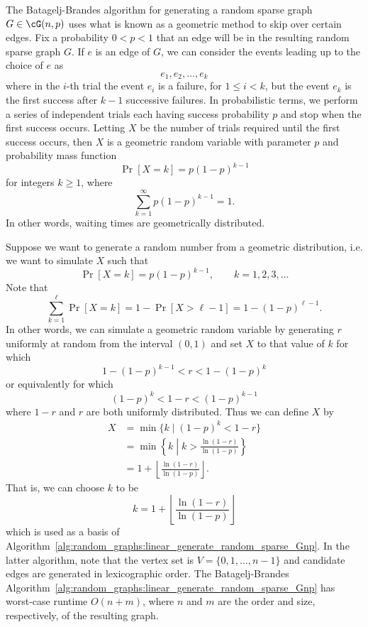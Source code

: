 The Batagelj-Brandes algorithm for
generating a random sparse graph $G \in \cG(n,p)$ uses what is known as
a geometric method to skip over certain edges. Fix a probability
$0 < p < 1$ that an edge will be in the resulting random sparse graph
$G$. If $e$ is an edge of $G$, we can consider the events leading up
to the choice of $e$ as
\[
e_1, e_2, \dots, e_k
\]
where in the $i$-th trial the event $e_i$ is a failure, for
$1 \leq i < k$, but the event $e_k$ is the first success after
$k - 1$ successive failures. In probabilistic terms, we perform a
series of independent trials each having success probability $p$ and
stop when the first success occurs. Letting $X$ be the number of
trials required until the first success occurs, then $X$ is a
geometric random variable with parameter $p$ and probability mass
function
\begin{equation}
\label{eqn:random_graphs:probability_mass_function_geometric_distribution}
\Pr[X = k]
=
p (1 - p)^{k - 1}
\end{equation}
for integers $k \geq 1$, where
\[
\sum_{k=1}^\infty p (1 - p)^{k - 1}
=
1.
\]
In other words, waiting times are
geometrically distributed.

Suppose we want to generate a random
number from a
geometric distribution, i.e. we want to
simulate $X$ such that
\[
\Pr[X = k]
=
p (1 - p)^{k-1},
\qquad
k = 1, 2, 3, \dots
\]
Note that
\[
\sum_{k=1}^{\ell} \Pr[X=k]
=
1 - \Pr[X > \ell - 1]
=
1 - (1 - p)^{\ell - 1}.
\]
In other words, we can simulate a
geometric random variable by
generating $r$ uniformly at random from the interval $(0,1)$ and set
$X$ to that value of $k$ for which
\[
1 - (1 - p)^{k-1} < r < 1 - (1 - p)^k
\]
or equivalently for which
\[
(1 - p)^k < 1 - r < (1 - p)^{k-1}
\]
where $1 - r$ and $r$ are both uniformly
distributed. Thus we can define $X$ by
\begin{align*}
X
&=
\min\{k \mid (1 - p)^k < 1 - r\} \\[4pt]
&=
\min\left\{
  k \;\left|\; k > \frac{\ln(1 - r)} {\ln(1 - p)} \right.
\right\} \\[4pt]
&=
1 + \left\lfloor \frac{\ln(1 - r)} {\ln(1 - p)} \right\rfloor.
\end{align*}
That is, we can choose $k$ to be
\[
k
=
1 + \left\lfloor \frac{\ln(1 - r)} {\ln(1 - p)} \right\rfloor
\]
which is used as a basis of
Algorithm~\ref{alg:random_graphs:linear_generate_random_sparse_Gnp}. In
the latter algorithm, note that the vertex set is
$V = \{0, 1, \dots, n-1\}$ and candidate edges are generated in
lexicographic order. The Batagelj-Brandes
Algorithm~\ref{alg:random_graphs:linear_generate_random_sparse_Gnp}
has worst-case runtime $O(n + m)$, where $n$ and $m$ are the order and
size, respectively, of the resulting graph.

